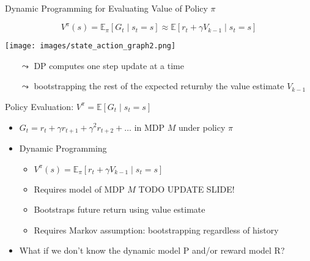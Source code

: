 \documentclass[aspectratio=169]{../latex_main/tntbeamer}  %
\begin{document}
\begin{frame}[c]{Dynamic Programming for Evaluating Value of Policy $\pi$}

$$V^\pi (s) = \mathbb{E}_\pi [G_t \mid s_t = s] \approx \mathbb{E} [r_t + \gamma V_{k-1} \mid s_t = s]$$

\begin{center}
	\texttt{[image: images/state\_action\_graph2.png]}
\end{center}

\vspace{-1cm}
\pause
\begin{itemize}
	\item[$\leadsto$] DP computes one step update at a time
	\item[$\leadsto$] bootstrapping the rest of the expected return\newline by the value estimate $V_{k-1}$
\end{itemize}

\end{frame}
\begin{frame}[c]{Policy Evaluation: $V^\pi = \mathbb{E}[G_t \mid s_t = s]$}

\begin{itemize}
	\item $G_t = r_t + \gamma r_{t+1} + \gamma^2 r_{t+2} + \ldots$ in MDP $M$ under policy $\pi$
	\item Dynamic Programming
	\begin{itemize}
		\item $V^\pi (s)  = \mathbb{E}_\pi [r_t + \gamma V_{k-1} \mid s_t = s]$
		\item \alert{Requires model of MDP $M$} TODO UPDATE SLIDE!
		\item Bootstraps future return using value estimate
		\item Requires Markov assumption: bootstrapping regardless of history
	\end{itemize}
	\pause
	\medskip
	\item What if we don't know the dynamic model P and/or reward model R? 
\end{itemize}

\end{frame}
\end{document}

